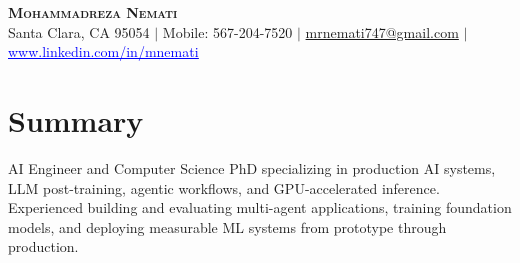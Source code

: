 \documentclass[letterpaper,13pt]{article}
\begin{document}
\begin{center}
    \textbf{\LARGE \scshape Mohammadreza Nemati} \\ \vspace{1pt}
    \small Santa Clara, CA 95054 $|$ Mobile: 567-204-7520 $|$
    \href{mailto:mrnemati747@gmail.com}{mrnemati747@gmail.com} $|$
    \href{https://www.linkedin.com/in/mnemati/}{\textcolor{blue}{\underline{www.linkedin.com/in/mnemati}}}
\end{center}

\section{Summary}
\small{AI Engineer and Computer Science PhD specializing in production AI systems, LLM post-training, agentic workflows, and GPU-accelerated inference. Experienced building and evaluating multi-agent applications, training foundation models, and deploying measurable ML systems from prototype through production.}
\vspace{0.05cm}
\end{document}
